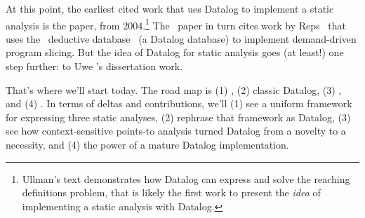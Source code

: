 \documentclass{article}
\begin{document}
At this point, the earliest cited work that ues Datalog to implement a static analysis is the \bddbddb{} paper, from 2004.\footnote{Ullman's text demonstrates how Datalog can express and solve the reaching definitions problem, that is likely the first work to present the \emph{idea} of implementing a static analysis with Datalog.}
The \bddbddb\ paper in turn cites work by Reps~\cite{r-ald-1994} that uses the \coral\ deductive database~\cite{rsss-sigmod-1993} (a Datalog database) to implement demand-driven program slicing.
But the idea of Datalog for static analysis goes (at least!) one step further: to Uwe \assmann{}'s dissertation work.

That's where we'll start today.
The road map is (1) \assmann{}, (2) classic Datalog, (3) \bddbddb, and (4) \doop{}.
In terms of deltas and contributions, we'll (1) see a uniform framework for expressing three static analyses, (2) rephrase that framework as Datalog, (3) see how context-sensitive points-to analysis turned Datalog from a novelty to a necessity, and (4) the power of a mature Datalog implementation.


\end{document}
